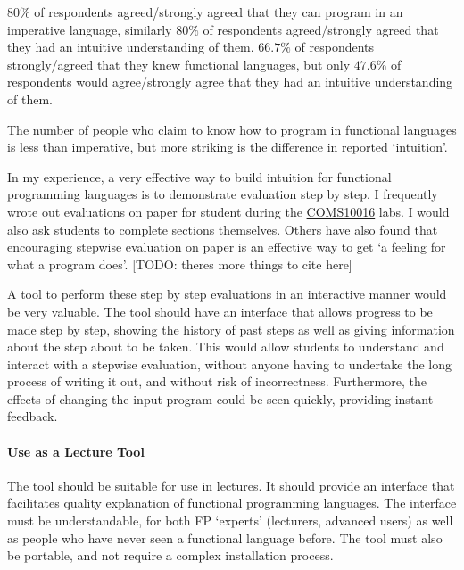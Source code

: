 $80\%$ of respondents agreed/strongly agreed that they can program in an imperative language, similarly $80\%$ of respondents agreed/strongly agreed that they had an intuitive understanding of them. $66.7\%$ of respondents strongly/agreed that they knew functional languages, but only $47.6\%$ of respondents would agree/strongly agree that they had an intuitive understanding of them.

The number of people who claim to know how to program in functional languages is less than imperative, but more striking is the difference in reported `intuition'. 


In my experience, a very effective way to build intuition for functional programming languages is to demonstrate evaluation step by step. I frequently wrote out evaluations on paper for student during the \hyperref[COMS10016]{COMS10016} labs. I would also ask students to complete sections themselves. Others have also found that encouraging stepwise evaluation on paper is an effective way to get `a feeling for what a program does'. \cite{fp_first_year} [TODO: theres more things to cite here]

A tool to perform these step by step evaluations in an interactive manner would be very valuable. The tool should have an interface that allows progress to be made step by step, showing the history of past steps as well as giving information about the step about to be taken. This would allow students to understand and interact with a stepwise evaluation, without anyone having to undertake the long process of writing it out, and without risk of incorrectness. Furthermore, the effects of changing the input program could be seen quickly, providing instant feedback. 

\paragraph{Use as a Lecture Tool} The tool should be suitable for use in lectures. It should provide an interface that facilitates quality explanation of functional programming languages. The interface must be understandable, for both \ac{FP} `experts' (lecturers, advanced users) as well as people who have never seen a functional language before. The tool must also be portable, and not require a complex installation process. 

